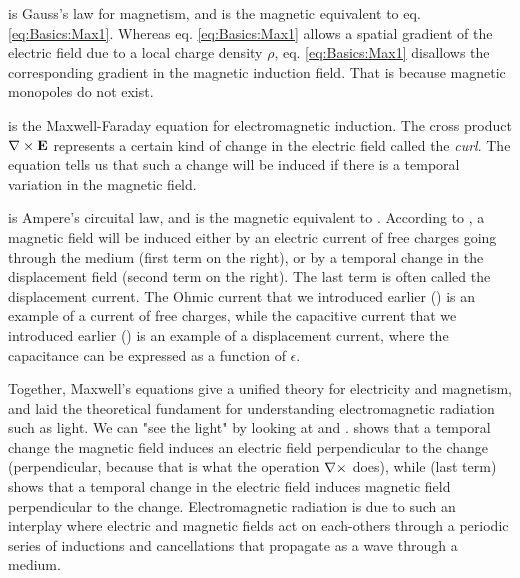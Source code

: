  is Gauss's law for magnetism, and is the magnetic equivalent to eq. \ref{eq:Basics:Max1}. Whereas eq. \ref{eq:Basics:Max1} allows a spatial gradient of the electric field due to a local charge density $\rho$, eq. \ref{eq:Basics:Max1} disallows the corresponding gradient in the magnetic induction field. That is because magnetic monopoles do not exist. 

 is the Maxwell-Faraday equation for electromagnetic induction. The cross product ${\bf \nabla} \times {\bf E}$ represents a certain kind of change in the electric field called the \textit{curl}. The equation tells us that such a change will be induced if there is a temporal variation in the magnetic field. 

 is Ampere's circuital law, and is the magnetic equivalent to . According to , a magnetic field will be induced either by an electric current of free charges going through the medium (first term on the right), or by a temporal change in the displacement field (second term on the right). The last term is often called the displacement current. The Ohmic current that we introduced earlier () is an example of a current of free charges, while the capacitive current that we introduced earlier () is an example of a displacement current, where the capacitance can be expressed as a function of $\epsilon$. 

Together, Maxwell's equations give a unified theory for electricity and magnetism, and laid the theoretical fundament for understanding electromagnetic radiation such as light. We can "see the light" by looking at  and .  shows that a temporal change the magnetic field induces an electric field perpendicular to the change (perpendicular, because that is what the operation ${\bf \nabla} \times$ does), while  (last term) shows that a temporal change in the electric field induces magnetic field perpendicular to the change. Electromagnetic radiation is due to such an interplay where electric and magnetic fields act on each-others through a periodic series of inductions and cancellations that propagate as a wave through a medium. 

